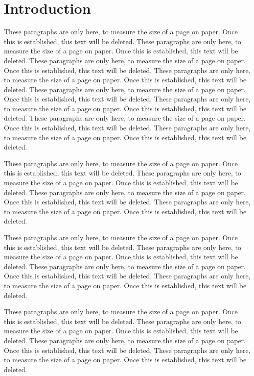 
\chapter{Introduction}

These paragraphs are only here, to measure the size of a page on paper.
Once this is established, this text will be deleted.
These paragraphs are only here, to measure the size of a page on paper.
Once this is established, this text will be deleted.
These paragraphs are only here, to measure the size of a page on paper.
Once this is established, this text will be deleted.
These paragraphs are only here, to measure the size of a page on paper.
Once this is established, this text will be deleted.
These paragraphs are only here, to measure the size of a page on paper.
Once this is established, this text will be deleted.
These paragraphs are only here, to measure the size of a page on paper.
Once this is established, this text will be deleted.
These paragraphs are only here, to measure the size of a page on paper.
Once this is established, this text will be deleted.
These paragraphs are only here, to measure the size of a page on paper.
Once this is established, this text will be deleted.

These paragraphs are only here, to measure the size of a page on paper.
Once this is established, this text will be deleted.
These paragraphs are only here, to measure the size of a page on paper.
Once this is established, this text will be deleted.
These paragraphs are only here, to measure the size of a page on paper.
Once this is established, this text will be deleted.
These paragraphs are only here, to measure the size of a page on paper.
Once this is established, this text will be deleted.

These paragraphs are only here, to measure the size of a page on paper.
Once this is established, this text will be deleted.
These paragraphs are only here, to measure the size of a page on paper.
Once this is established, this text will be deleted.
These paragraphs are only here, to measure the size of a page on paper.
Once this is established, this text will be deleted.
These paragraphs are only here, to measure the size of a page on paper.
Once this is established, this text will be deleted.

These paragraphs are only here, to measure the size of a page on paper.
Once this is established, this text will be deleted.
These paragraphs are only here, to measure the size of a page on paper.
Once this is established, this text will be deleted.
These paragraphs are only here, to measure the size of a page on paper.
Once this is established, this text will be deleted.
These paragraphs are only here, to measure the size of a page on paper.
Once this is established, this text will be deleted.


